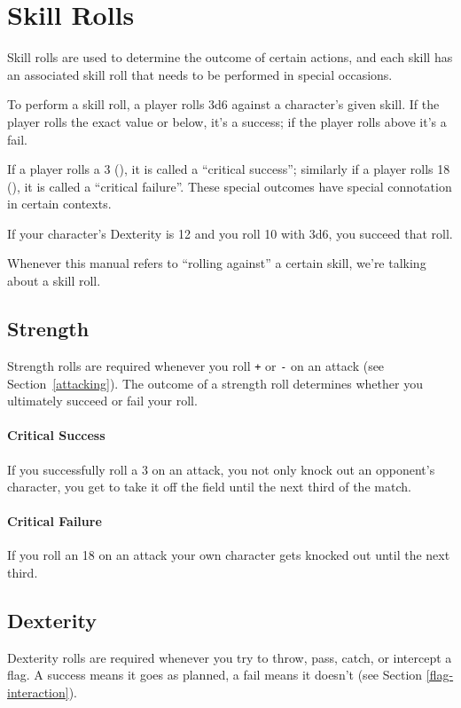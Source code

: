 \section{Skill Rolls}\label{skill-rolls}
Skill rolls are used to determine the outcome of certain actions, and each skill has an associated skill roll that needs to be performed in special occasions.

To perform a skill roll, a player rolls 3d6 against a character's given skill.
If the player rolls the exact value or below, it's a success; if the player rolls above it's a fail.

If a player rolls a 3 (), it is called a ``critical success''; similarly if a player rolls 18 (), it is called a ``critical failure''.
These special outcomes have special connotation in certain contexts.

\begin{example}
    If your character's Dexterity is 12 and you roll 10 with 3d6, you succeed that roll.
\end{example}

\begin{note}
    Whenever this manual refers to ``rolling against'' a certain skill, we're talking about a skill roll.
\end{note}

\subsection{Strength}
Strength rolls are required whenever you roll \texttt{+} or \texttt{-} on an attack (see Section~\ref{attacking}).
The outcome of a strength roll determines whether you ultimately succeed or fail your roll.

\paragraph{Critical Success} If you successfully roll a 3 on an attack, you not only knock out an opponent's character, you get to take it off the field until the next third of the match.

\paragraph{Critical Failure} If you roll an 18 on an attack your own character gets knocked out until the next third.
\subsection{Dexterity}
Dexterity rolls are required whenever you try to throw, pass, catch, or intercept a flag.
A success means it goes as planned, a fail means it doesn't (see Section \ref{flag-interaction}).

